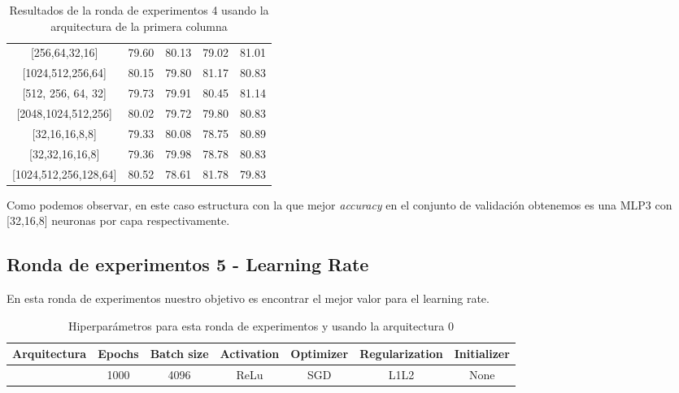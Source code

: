 \documentclass{article}
\begin{document}
\begin{center}
\begin{table}[h!]
\begin{tabular}{c|cccc}
{[}256,64,32,16{]}        & 79.60          & 80.13          & 79.02          & 81.01          \\
{[}1024,512,256,64{]}     & 80.15          & 79.80          & 81.17          & 80.83          \\
{[}512, 256, 64, 32{]}    & 79.73          & 79.91          & 80.45          & 81.14          \\
{[}2048,1024,512,256{]}   & 80.02          & 79.72          & 79.80          & 80.83          \\
{[}32,16,16,8,8{]}        & 79.33          & 80.08          & 78.75          & 80.89          \\
{[}32,32,16,16,8{]}       & 79.36          & 79.98          & 78.78          & 80.83          \\
{[}1024,512,256,128,64{]} & 80.52          & 78.61          & 81.78          & 79.83          \\ \hline
\end{tabular}

                \caption{Resultados de la ronda de experimentos 4 usando la arquitectura de la primera columna}
                \label{tab:res-j-a0-e4}
                \end{table}
                \end{center}
		    
		    Como podemos observar, en este caso estructura con la que mejor \textit{accuracy} en el conjunto de validaci\'on obtenemos es una MLP3 con [32,16,8] neuronas por capa respectivamente.
      \newpage
\subsection{Ronda de experimentos 5 - Learning Rate}  
En esta ronda de experimentos nuestro objetivo es encontrar el mejor valor para el learning rate. 

			\begin{table}[h!]
				\begin{center}
					\begin{tabular}{| c | c | c | c | c | c | c |}
						\textbf{Arquitectura} & \textbf{Epochs} & \textbf{Batch size} & \textbf{Activation} & \textbf{Optimizer} & \textbf{Regularization} & \textbf{Initializer}\\ \hline
						[32,16,8] & 1000 & 4096 & ReLu & SGD & L1L2 & None
					\end{tabular}
					\caption{Hiperpar\'ametros para esta ronda de experimentos y usando la arquitectura 0}
					\label{tab:hip-j-a0-e5}
				\end{center}
			\end{table}
			
\end{document}

